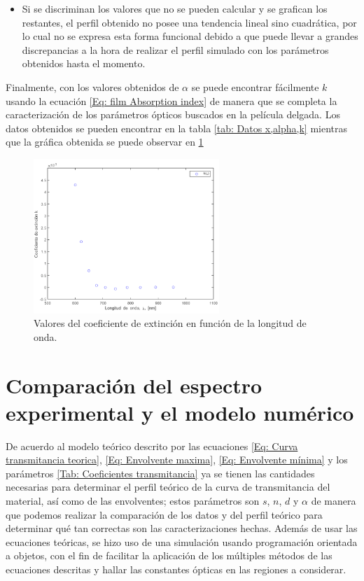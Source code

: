 \documentclass[article]{article}
\begin{document}
\begin{multicols}{2}
\begin{itemize}
            \item Si se discriminan los valores que no se pueden calcular y se grafican los restantes, el perfil obtenido no posee una tendencia lineal sino cuadrática, por lo cual no se expresa esta forma funcional debido a que puede llevar a grandes discrepancias a la hora de realizar el perfil simulado con los parámetros obtenidos hasta el momento.
        \end{itemize}
         
        
        Finalmente, con los valores obtenidos de $\alpha$ se puede encontrar fácilmente $k$ usando la ecuación \ref{Eq: film Absorption index} de manera que se completa la caracterización de los parámetros ópticos buscados en la película delgada. Los datos obtenidos se pueden encontrar en la tabla \ref{tab: Datos x,alpha,k} mientras que la gráfica obtenida se puede observar en \ref{fig: Extintion Data}
        
        \begin{figure}[H]
        \centering
        \includegraphics[width=7cm]{extincion-coefficient.png}
        \caption{Valores del coeficiente de extinción en función de la longitud de onda.}
        \label{fig: Extintion Data}
        \end{figure}
        
    \section{Comparación del espectro experimental y el modelo numérico}
     
    De acuerdo al modelo teórico descrito por las ecuaciones \ref{Eq: Curva transmitancia teorica}, \ref{Eq: Envolvente maxima}, \ref{Eq: Envolvente mínima} y los parámetros \ref{Tab: Coeficientes transmitancia} ya se tienen las cantidades necesarias para determinar el perfil teórico de la curva de transmitancia del material, así como de las envolventes; estos parámetros son $s$, $n$, $d$ y $\alpha$ de manera que podemos realizar la comparación de los datos y del perfil teórico para determinar qué tan correctas son las caracterizaciones hechas. Además de usar las ecuaciones teóricas, se hizo uso de una simulación usando programación orientada a objetos, con el fin de facilitar la aplicación de los múltiples métodos de las ecuaciones descritas y hallar las constantes ópticas en las regiones a considerar.
    

\end{multicols}
\end{document}
